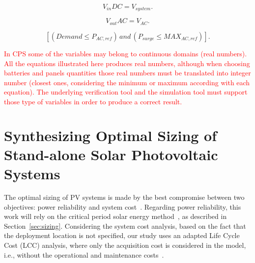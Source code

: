 \documentclass[runningheads]{llncs}
\begin{document}
\begin{equation}
\label{eq:vindc} 
V_{in}DC = V_{system}.
\end{equation}

\begin{equation}
\label{eq:voutac} 
V_{out}AC = V_{AC}.
\end{equation}

\begin{equation}
\label{eq:invcheck} 
\left[ (Demand \leq P_{AC,ref}) \, and \, (P_{surge} \leq MAX_{AC,ref}) \right].
\end{equation}

\textcolor{red}{In CPS some of the variables may belong to continuous domains (real numbers).  All the equations illustrated here produces real numbers, although when choosing batteries and panels quantities those real numbers must be translated into integer number (closest ones, considering the minimum or maximum according with each equation). The underlying verification tool and the simulation tool must support those type of variables in order to produce a correct result.}

\section{Synthesizing Optimal Sizing of Stand-alone Solar Photovoltaic Systems}

The optimal sizing of PV systems is made by the best compromise between two objectives: power reliability and system cost~\cite{Alsadi2018}. 
Regarding power reliability, this work will rely on the critical period solar energy method~\cite{Pinho}, as described in Section~\ref{sec:sizing}. 
Considering the system cost analysis, based on the fact that the deployment location is not specified, our study uses an adapted Life Cycle Cost (LCC) analysis, where only the acquisition cost is considered in the model, i.e., without the operational and maintenance costs~\cite{Alsadi2018}.
\end{document}
